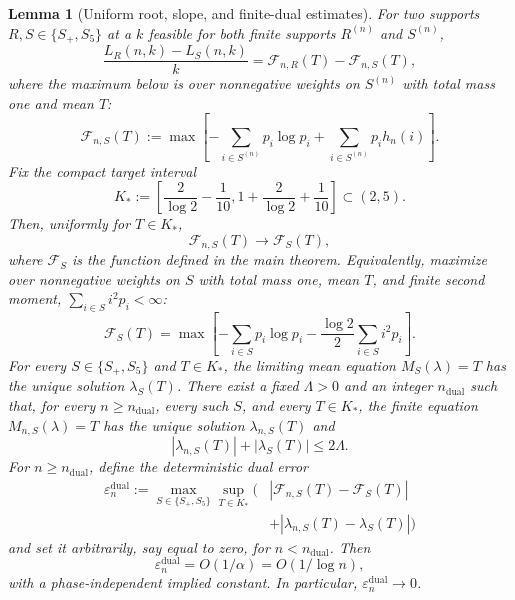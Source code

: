 \documentclass[a4paper,10pt,reqno]{amsart}
\numberwithin{equation}{section}
\theoremstyle{plain}
\newtheorem{lemma}[theorem]{Lemma}
\theoremstyle{remark}
\begin{document}
\begin{lemma}[Uniform root, slope, and finite-dual estimates]
For two supports $R,S\in\{S_+,S_5\}$ at a $k$ feasible for both finite
supports $R^{(n)}$ and $S^{(n)}$,
\begin{equation*}
  \frac{L_R(n,k)-L_S(n,k)}{k}
  =\mathcal F_{n,R}(T)-\mathcal F_{n,S}(T),
  \tag{3.8}
\end{equation*}
where the maximum below is over nonnegative weights on $S^{(n)}$ with
total mass one and mean $T$:
\begin{equation*}
  \mathcal F_{n,S}(T)
  :=
  \max
  \left[
    -\sum_{i\in S^{(n)}} p_i\log p_i
    +\sum_{i\in S^{(n)}} p_i h_n(i)
  \right].
  \tag{3.8a}
\end{equation*}
Fix the compact target interval
\begin{equation*}
  K_*:=
  \left[
    \frac2{\log 2}-\frac1{10},
    1+\frac2{\log 2}+\frac1{10}
  \right]
  \subset(2,5).
  \tag{3.9}
\end{equation*}
Then, uniformly for $T\in K_*$,
\begin{equation*}
  \mathcal F_{n,S}(T)
  \longrightarrow
  \mathcal F_S(T),
\end{equation*}
where $\mathcal F_S$ is the function defined in the main theorem.
Equivalently, maximize over nonnegative weights on $S$ with total mass one,
mean $T$, and finite second moment, $\sum_{i\in S}i^2p_i<\infty$:
\begin{equation*}
  \mathcal F_S(T)
  =
  \max
  \left[
    -\sum_{i\in S} p_i\log p_i
    -\frac{\log 2}{2}\sum_{i\in S} i^2p_i
  \right].
  \tag{3.9a}
\end{equation*}
For every $S\in\{S_+,S_5\}$ and $T\in K_*$, the limiting mean equation
$M_S(\lambda)=T$ has the unique solution $\lambda_S(T)$. There exist a fixed
$\Lambda>0$ and an integer $n_{\mathrm{dual}}$ such that, for every
$n\ge n_{\mathrm{dual}}$, every such $S$, and every $T\in K_*$, the finite
equation $M_{n,S}(\lambda)=T$ has the unique solution $\lambda_{n,S}(T)$ and
\[
  |\lambda_{n,S}(T)|+|\lambda_S(T)|\le2\Lambda.
\]
For $n\ge n_{\mathrm{dual}}$, define the deterministic dual error
\[
\begin{split}
  \varepsilon_n^{\mathrm{dual}}
  :=\max_{S\in\{S_+,S_5\}}
  \sup_{T\in K_*}
  \bigl(&|\mathcal F_{n,S}(T)-\mathcal F_S(T)|\\
        &+|\lambda_{n,S}(T)-\lambda_S(T)|\bigr)
\end{split}
\]
and set it arbitrarily, say equal to zero, for $n<n_{\mathrm{dual}}$. Then
\[
  \varepsilon_n^{\mathrm{dual}}
  =O(1/\alpha)=O(1/\log n),
\]
with a phase-independent implied constant. In particular,
$\varepsilon_n^{\mathrm{dual}}\to0$.


\end{lemma}
\end{document}
